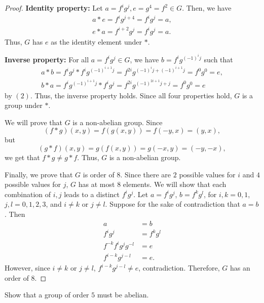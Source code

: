 \documentclass[addpoints, 11pt]{exam}
\newenvironment{question}[1]{\smallskip\noindent\color{crimson}{\bf Question #1.}}{}
\begin{document}
\begin{proof}
    \textbf{Identity property:} Let $a = f^ig^j, e = g^4 = f^2 \in G$. Then, we have
    \begin{gather*}
        a * e = f^ig^{j + 4} = f^ig^j = a, \\
        e * a = f^{i + 2}g^j = f^ig^j = a.
    \end{gather*}
    Thus, $G$ has $e$ as the identity element under $*$.

    \textbf{Inverse property:} For all $a = f^ig^j \in G$, we have $b = f^{i}g^{(-1)^ij}$ such that
    \begin{gather*}
        a * b = f^ig^j * f^{i}g^{(-1)^{i + 1}j} = f^{2i}g^{(-1)^ij + (-1)^{i + 1}j} = f^0g^0 = e, \\
        b * a = f^{i}g^{(-1)^{i + 1}j} * f^ig^j = f^{2i}g^{(-1)^{2i + 1}j + j} = f^0g^0 = e
    \end{gather*}
    by $(2)$. Thus, the inverse property holds. Since all four properties hold, $G$ is a group under $*$.

    We will prove that $G$ is a non-abelian group. Since 
    \[
        (f * g)(x, y) = f(g(x, y)) = f(-y, x) = (y, x),
    \]
    but
    \[
        (g * f)(x, y) = g(f(x, y)) = g(-x, y) = (-y, -x),
    \]
    we get that $f * g \neq g * f$. Thus, $G$ is a non-abelian group.

    Finally, we prove that $G$ is order of $8$. Since there are $2$ possible values for $i$ and $4$ possible values for $j$, $G$ has at most $8$ elements. We will show that each combination of $i, j$ leads to a distinct $f^ig^j$. Let $a = f^ig^j$, $b = f^kg^l$, for $i, k = 0 ,1$, $j, l = 0, 1, 2, 3$, and $i \neq k$ or $j \neq l$. Suppose for the sake of contradiction that $a = b$. Then
    \begin{align*}
        a &= b \\
        f^ig^j &= f^kg^l \\
        f^{-k}f^ig^jg^{-l} &= e \\
        f^{i - k}g^{j - l} &= e.
    \end{align*}
    However, since $i \neq k$ or $j \neq l$, $f^{i - k}g^{j - l} \neq e$, contradiction. Therefore, $G$ has an order of $8$.
\end{proof}

\newpage

\begin{question}{2.1.21}
    Show that a group of order $5$ must be abelian.
\end{question}
\end{document}
